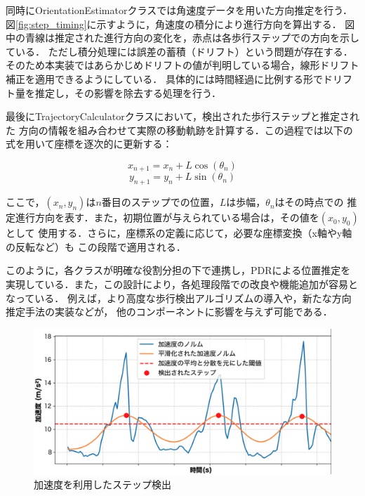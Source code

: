 同時にOrientationEstimatorクラスでは角速度データを用いた方向推定を行う．
図\ref{fig:step_timing}に示すように，角速度の積分により進行方向を算出する．
図中の青線は推定された進行方向の変化を，赤点は各歩行ステップでの方向を示している．
ただし積分処理には誤差の蓄積（ドリフト）という問題が存在する．
そのため本実装ではあらかじめドリフトの値が判明している場合，線形ドリフト補正を適用できるようにしている．
具体的には時間経過に比例する形でドリフト量を推定し，その影響を除去する処理を行う．

最後にTrajectoryCalculatorクラスにおいて，検出された歩行ステップと推定された
方向の情報を組み合わせて実際の移動軌跡を計算する．この過程では以下の式を用いて座標を逐次的に更新する：

\begin{equation}
x_{n+1} = x_n + L \cos(\theta_n)
\end{equation}
\begin{equation}
y_{n+1} = y_n + L \sin(\theta_n)
\end{equation}

ここで，$(x_n, y_n)$は$n$番目のステップでの位置，$L$は歩幅，$\theta_n$はその時点での
推定進行方向を表す．また，初期位置が与えられている場合は，その値を$(x_0, y_0)$として
使用する．さらに，座標系の定義に応じて，必要な座標変換（x軸やy軸の反転など）も
この段階で適用される．

このように，各クラスが明確な役割分担の下で連携し，PDRによる位置推定を
実現している．また，この設計により，各処理段階での改良や機能追加が容易となっている．
例えば，より高度な歩行検出アルゴリズムの導入や，新たな方向推定手法の実装などが，
他のコンポーネントに影響を与えず可能である．


\begin{figure}[H]
	\centering
	\includegraphics[width=\linewidth]{image/step_detect.jpg}
	\caption{加速度を利用したステップ検出}    \label{fig:step_detect}
\end{figure}


